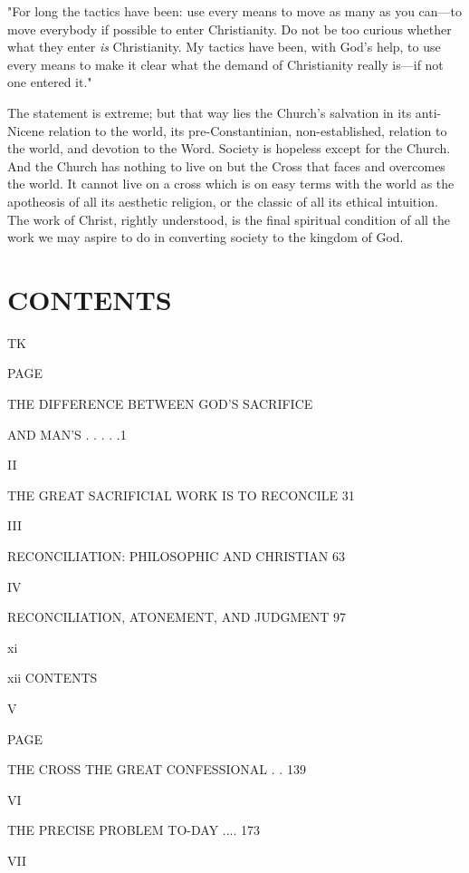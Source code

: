 \documentclass[12pt,letterpaper,oneside]{book}
\begin{document}
"For long the tactics have been: use every 
means to move as many as you can---to move 
everybody if possible to enter Christianity. 
Do not be too curious whether what they enter 
\textit{is} Christianity. My tactics have been, with 
God's help, to use every means to make it clear 
what the demand of Christianity really is---if 
not one entered it." 

The statement is extreme; but that way lies 
the Church's salvation in its anti-Nicene relation 
to the world, its pre-Constantinian, non-established, relation to the world, and devotion 
to the Word. Society is hopeless except for the 
Church. And the Church has nothing to live on 
but the Cross that faces and overcomes the 
world. It cannot live on a cross which is on 
easy terms with the world as the apotheosis of 
all its aesthetic religion, or the classic of all its 
ethical intuition. The work of Christ, rightly 
understood, is the final spiritual condition of all 
the work we may aspire to do in converting 
society to the kingdom of God. 


\chapter*{CONTENTS}
TK


PAGE 

THE DIFFERENCE BETWEEN GOD'S SACRIFICE 

AND MAN'S . . . . .1 



II 

THE GREAT SACRIFICIAL WORK IS TO RECONCILE 31 



III 

RECONCILIATION: PHILOSOPHIC AND CHRISTIAN 63 



IV 

RECONCILIATION, ATONEMENT, AND JUDGMENT 97 

xi 



xii CONTENTS 

V 

PAGE 

THE CROSS THE GREAT CONFESSIONAL . . 139 



VI 

THE PRECISE PROBLEM TO-DAY .... 173 



VII 
\end{document}
